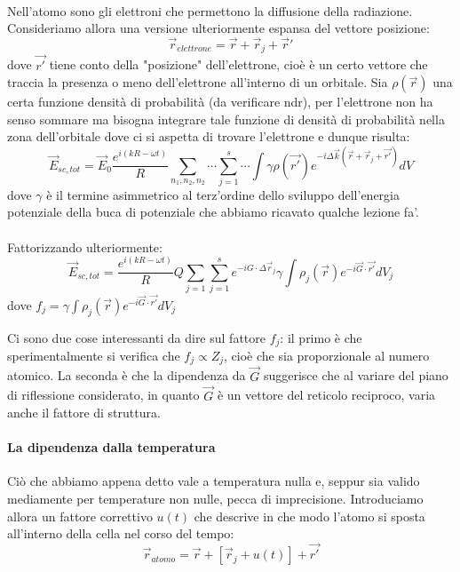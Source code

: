 \documentclass{book}
\begin{document}
        \paragraph{}
            Nell'atomo sono gli elettroni che permettono la diffusione della radiazione. Consideriamo allora una versione ulteriormente espansa del vettore posizione:
            $$\vec{r}_{elettrone} = \vec{r} + \vec{r}_{j} + \vec{r}'$$
            dove $\vec{r'}$ tiene conto della "posizione" dell'elettrone, cioè è un certo vettore che traccia la presenza o meno dell'elettrone all'interno di un orbitale.
            Sia $\rho(\vec{r})$ una certa funzione densità di probabilità (da verificare ndr), per l'elettrone non ha senso sommare ma bisogna integrare tale funzione di densità di probabilità nella zona dell'orbitale dove ci si aspetta di trovare l'elettrone e dunque risulta:
            $$\vec{E}_{sc, tot} = \vec{E}_{0} \frac{e^{i(kR - \omega t)}}{R} \sum_{n_{1}, n_{2}, n_{2}} \cdots \sum_{j=1} ^{s} \cdots \int \gamma \rho (\vec{r'}) e^{-i \Delta \vec{k}(\vec{r}+\vec{r}_{j}+\vec{r'})}dV$$
            dove $\gamma$ è il termine asimmetrico al terz'ordine dello sviluppo dell'energia potenziale della buca di potenziale che abbiamo ricavato qualche lezione fa'.
        \paragraph{}
            Fattorizzando ulteriormente:
            $$\vec{E}_{sc,tot} = \frac{e^{i(k R - \omega t)}}{R} Q \sum_{j =1} \sum_{j=1} ^{s} e^{-iG \cdot \Delta \vec{r}_{j}} \gamma \int \rho_{j} (\vec{r}) e^{-i\vec{G} \cdot \vec{r'}} dV_{j}$$
            dove $f_{j} = \gamma \int \rho_{j} (\vec{r}) e^{-i\vec{G} \cdot \vec{r'}}dV_{j}$

            Ci sono due cose interessanti da dire sul fattore $f_{j}$: il primo è che sperimentalmente si verifica che $f_{j} \propto Z_{j}$, cioè che sia proporzionale al numero atomico. La seconda è che la dipendenza da $\vec{G}$ suggerisce che al variare del piano di riflessione considerato, in quanto $\vec{G}$ è un vettore del reticolo reciproco, varia anche il fattore di struttura.

        \paragraph{La dipendenza dalla temperatura} Ciò che abbiamo appena detto vale a temperatura nulla e, seppur sia valido mediamente per temperature non nulle, pecca di imprecisione. Introduciamo allora un fattore correttivo $u(t)$ che descrive in che modo l'atomo si sposta all'interno della cella nel corso del tempo:
        $$\vec{r}_{atomo} = \vec{r} + [\vec{r}_{j} + u(t)]+\vec{r'}$$
\end{document}
